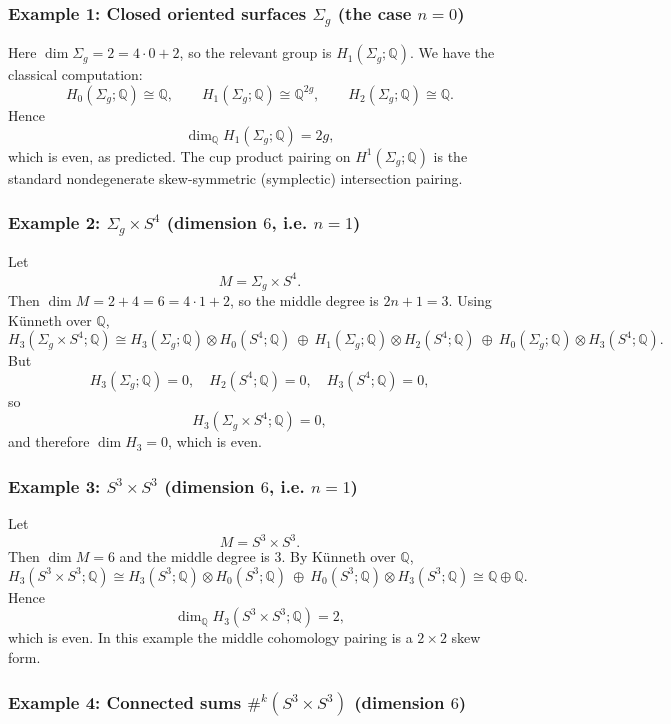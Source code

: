 \documentclass[12pt,a4paper]{article}
\theoremstyle{notespace}
\begin{document}
\subsubsection{Example 1: Closed oriented surfaces \(\Sigma_g\) (the case \(n=0\))}

Here \(\dim \Sigma_g = 2 = 4\cdot 0 + 2\), so the relevant group is \(H_1(\Sigma_g;\mathbb Q)\).
We have the classical computation:
\[
H_0(\Sigma_g;\mathbb Q)\cong \mathbb Q,\qquad
H_1(\Sigma_g;\mathbb Q)\cong \mathbb Q^{2g},\qquad
H_2(\Sigma_g;\mathbb Q)\cong \mathbb Q.
\]
Hence
\[
\dim_{\mathbb Q} H_1(\Sigma_g;\mathbb Q)=2g,
\]
which is even, as predicted. The cup product pairing on \(H^1(\Sigma_g;\mathbb Q)\) is the standard
nondegenerate skew-symmetric (symplectic) intersection pairing.

\subsubsection{Example 2: \(\Sigma_g\times S^4\) (dimension \(6\), i.e. \(n=1\))}

Let
\[
M=\Sigma_g\times S^4.
\]
Then \(\dim M = 2+4=6=4\cdot 1+2\), so the middle degree is \(2n+1=3\).
Using K\"unneth over \(\mathbb Q\),
\[
H_3(\Sigma_g\times S^4;\mathbb Q)
\cong
H_3(\Sigma_g;\mathbb Q)\otimes H_0(S^4;\mathbb Q)
\ \oplus\
H_1(\Sigma_g;\mathbb Q)\otimes H_2(S^4;\mathbb Q)
\ \oplus\
H_0(\Sigma_g;\mathbb Q)\otimes H_3(S^4;\mathbb Q).
\]
But
\[
H_3(\Sigma_g;\mathbb Q)=0,\quad H_2(S^4;\mathbb Q)=0,\quad H_3(S^4;\mathbb Q)=0,
\]
so
\[
H_3(\Sigma_g\times S^4;\mathbb Q)=0,
\]
and therefore \(\dim H_3=0\), which is even.

\subsubsection{Example 3: \(S^3\times S^3\) (dimension \(6\), i.e. \(n=1\))}

Let
\[
M=S^3\times S^3.
\]
Then \(\dim M=6\) and the middle degree is \(3\).
By K\"unneth over \(\mathbb Q\),
\[
H_3(S^3\times S^3;\mathbb Q)
\cong
H_3(S^3;\mathbb Q)\otimes H_0(S^3;\mathbb Q)
\ \oplus\
H_0(S^3;\mathbb Q)\otimes H_3(S^3;\mathbb Q)
\cong
\mathbb Q\oplus \mathbb Q.
\]
Hence
\[
\dim_{\mathbb Q} H_3(S^3\times S^3;\mathbb Q)=2,
\]
which is even. In this example the middle cohomology pairing is a \(2\times 2\) skew form.

\subsubsection{Example 4: Connected sums \(\#^k(S^3\times S^3)\) (dimension \(6\))}
\end{document}
